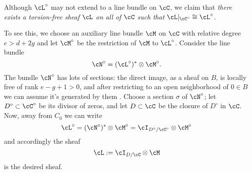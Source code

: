 
%
%
%

%
%

%

Although  $\cL^\circ$ may not extend to a line bundle on $\cC$, we claim that \emph{there exists a torsion-free sheaf $\cL$ on all of $\cC$ such that $\cL|_{\cC^\circ} \cong \cL^\circ$}.

To see this, we choose an auxiliary line bundle $\cM$ on $\cC$ with relative degree $e > d + 2g$ and let $\cM^\circ$ be the restriction of $\cM$ to $\cL^\circ$. Consider the line bundle 
$$
\cN^\circ = (\cL^\circ)^* \otimes \cM^\circ.
$$
The bundle $\cN^\circ$ has lots of sections: the direct image, as a sheaf on $B$, is locally free of rank $e-g+1 > 0$, and after restricting to an open neighborhood of $0 \in B$ we can assume it's generated by them . Choose a section $\sigma$ of $\cN^\circ$; let $D^\circ \subset \cC^\circ$ be its divisor of zeros, and let $D \subset \cC$ be the closure of $D^\circ$ in $\cC$. Now, away from $C_0$ we can write
$$
\cL^\circ = (\cN^\circ)^* \otimes \cM^\circ = \cI_{D^\circ/\cC^\circ} \otimes \cM^\circ
$$
and accordingly the sheaf
$$
\cL := \cI_{D/\cC} \otimes \cM
$$
is the desired sheaf. 

